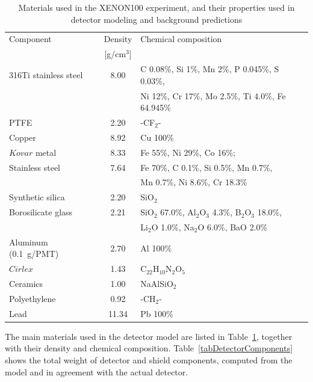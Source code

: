 \begin{table}[!ht]
\centering
{\caption{Materials used in the XENON100 experiment, and their properties used in detector  modeling and background predictions}
\label{tabDetectorMaterials}
\begin{tabular}{>{\footnotesize}l|>{\footnotesize}c|>{\footnotesize}l}
\hline
Component 						& Density  			& Chemical composition  \\
								& [g/cm$^{3}$]			& \\
\hline
316Ti stainless steel					& 8.00 		& C 0.08\%, Si 1\%, Mn 2\%, P 0.045\%, S 0.03\%, \\
								&			& Ni 12\%, Cr 17\%, Mo 2.5\%, Ti 4.0\%, Fe 64.945\% \\
PTFE							& 2.20 		& -CF$_{2}$- \\
Copper							& 8.92 		& Cu 100\% \\
$Kovar$ metal						& 8.33 		& Fe 55\%, Ni 29\%, Co 16\%;  \\
Stainless steel						& 7.64 		& Fe 70\%, C 0.1\%, Si 0.5\%, Mn 0.7\%, \\
								& 	 		& Mn 0.7\%, Ni 8.6\%, Cr 18.3\% \\
Synthetic silica						& 2.20 		& SiO$_{2}$ \\
Borosilicate glass					& 2.21 		& SiO$_{2}$ 67.0\%, Al$_{2}$O$_{3}$ 4.3\%, B$_{2}$O$_{3}$ 18.0\%, \\
								&			& Li$_{2}$O 1.0\%, Na$_{2}$O 6.0\%, BaO 2.0\% \\
Aluminum	 (0.1~g/PMT)				& 2.70 		& Al 100\% \\
$Cirlex$							& 1.43 	 	& C$_{22}$H$_{10}$N$_{2}$O$_{5}$ \\
Ceramics							& 1.00		& NaAlSiO$_{2}$ \\
Polyethylene						& 0.92		& -CH$_{2}$- \\
Lead								& 11.34		& Pb 100\% \\
\hline
\end{tabular}
}
\end{table}

The main materials used in the detector model are listed in Table~\ref{tabDetectorMaterials}, together with their density and  chemical composition. Table~\ref{tabDetectorComponents} shows the total weight of detector and shield components, computed from the model and in agreement with the actual detector.



